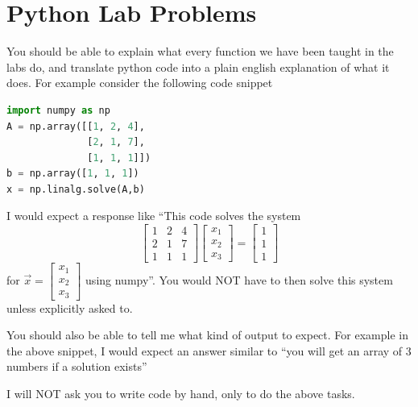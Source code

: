 \documentclass[12pt]{exam}
\begin{document}
\section{Python Lab Problems}
You should be able to explain what every function we have been taught in the labs do, and translate python
code into a plain english explanation of what it does. For example consider the following code snippet
\begin{lstlisting}[language=Python]
import numpy as np
A = np.array([[1, 2, 4],
              [2, 1, 7],
              [1, 1, 1]])
b = np.array([1, 1, 1])
x = np.linalg.solve(A,b)
\end{lstlisting}
I would expect a response like ``This code solves the system
    \[
        \begin{bmatrix}1&2&4 \\ 2&1&7 \\ 1&1&1 \end{bmatrix}\begin{bmatrix}x_1\\x_2\\x_3\end{bmatrix} =
            \begin{bmatrix} 1\\1\\1\end{bmatrix}
    \]
        for $\vec{x} = \begin{bmatrix}x_1\\x_2\\x_3\end{bmatrix}$ using numpy''.
    You would NOT have to then solve this system unless explicitly asked to.

    You should also be able to tell me what kind of output to expect. For example in the above snippet,
    I would expect an answer similar to ``you will get an array of 3 numbers if a solution exists''

    I will NOT ask you to write code by hand, only to do the above tasks.
\end{document}

